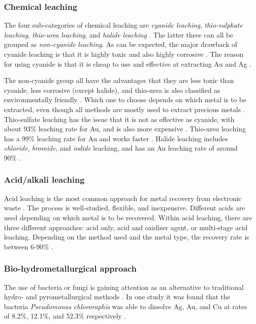 \subsubsection{Chemical leaching}

The four sub-categories of chemical leaching are \textit{cyanide leaching}, \textit{thio-sulphate leaching}, \textit{thio-urea leaching}, and \textit{halide leaching} \cite{javed2024}. The latter three can all be grouped as \textit{non-cyanide leaching}. As can be expected, the major drawback of cyanide leaching is that it is highly toxic and also highly corrosive \cite{cyanide}. The reason for using cyanide is that it is cheap to use and effective at extracting Au and Ag \cite{cyanide}\cite{javed2024}.

The non-cyanide group all have the advantages that they are less toxic than cyanide, less corrosive (except halide), and thio-urea is also classified as environmentally friendly \cite{thiourea}. Which one to choose depends on which metal is to be extracted, even though all methods are mostly used to extract precious metals \cite{javed2024}. Thio-sulfate leaching has the issue that it is not as effective as cyanide, with about 93\% leaching rate for Au, and is also more expensive \cite{javed2024}. Thio-urea leaching has a 99\% leaching rate for Au and works faster \cite{thiourea}. Halide leaching includes \textit{chloride}, \textit{bromide}, and \textit{iodide} leaching, and has an Au leaching rate of around 90\% \cite{javed2024}.

\subsubsection{Acid/alkali leaching}

Acid leaching is the most common approach for metal recovery from electronic waste \cite{javed2024}. The process is well-studied, flexible, and inexpensive. Different acids are used depending on which metal is to be recovered. Within acid leaching, there are three different approaches: acid only, acid and oxidiser agent, or multi-stage acid leaching. Depending on the method used and the metal type, the recovery rate is between 6-90\% \cite{javed2024}. 

\subsubsection{Bio-hydrometallurgical approach}

The use of bacteria or fungi is gaining attention as an alternative to traditional hydro- and pyrometallurgical methods \cite{javed2024}. In one study it was found that the bacteria \textit{Pseudomonas chlororaphis} was able to dissolve Ag, Au, and Cu at rates of 8.2\%, 12.1\%, and 52.3\% respectively \cite{bioleaching}. 

